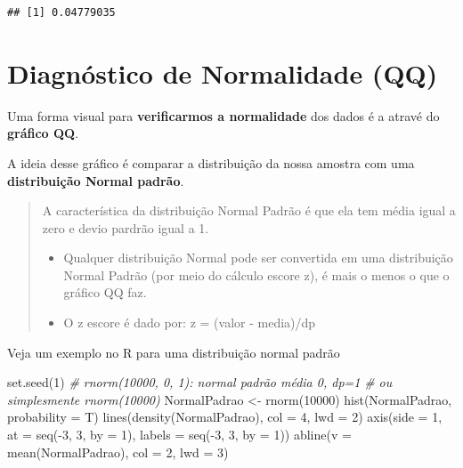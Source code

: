 \documentclass[
]{book}
\newenvironment{Shaded}{\begin{snugshade}}{\end{snugshade}}
\newcommand{\AttributeTok}[1]{\textcolor[rgb]{0.77,0.63,0.00}{#1}}
\newcommand{\CommentTok}[1]{\textcolor[rgb]{0.56,0.35,0.01}{\textit{#1}}}
\newcommand{\DecValTok}[1]{\textcolor[rgb]{0.00,0.00,0.81}{#1}}
\newcommand{\FunctionTok}[1]{\textcolor[rgb]{0.00,0.00,0.00}{#1}}
\newcommand{\NormalTok}[1]{#1}
\newcommand{\OtherTok}[1]{\textcolor[rgb]{0.56,0.35,0.01}{#1}}
\newcommand{\SpecialCharTok}[1]{\textcolor[rgb]{0.00,0.00,0.00}{#1}}
\begin{document}
\begin{verbatim}
## [1] 0.04779035
\end{verbatim}

\hypertarget{diagnuxf3stico-de-normalidade-qq}{%
\section{Diagnóstico de Normalidade (QQ)}\label{diagnuxf3stico-de-normalidade-qq}}

Uma forma visual para \textbf{verificarmos a normalidade} dos dados é a atravé do \textbf{gráfico QQ}.

A ideia desse gráfico é comparar a distribuição da nossa amostra com uma \textbf{distribuição Normal padrão}.

\begin{quote}
A característica da distribuição Normal Padrão é que ela tem média igual a zero e devio pardrão igual a 1.

\begin{itemize}
\item
  Qualquer distribuição Normal pode ser convertida em uma distribuição Normal Padrão (por meio do cálculo escore z), é mais o menos o que o gráfico QQ faz.
\item
  O z escore é dado por: z = (valor - media)/dp
\end{itemize}
\end{quote}

Veja um exemplo no R para uma distribuição normal padrão

\begin{Shaded}
\begin{Highlighting}[]
\FunctionTok{set.seed}\NormalTok{(}\DecValTok{1}\NormalTok{)}
\CommentTok{\# rnorm(10000, 0, 1): normal padrão média 0, dp=1}
\CommentTok{\# ou simplesmente rnorm(10000)}
\NormalTok{NormalPadrao }\OtherTok{\textless{}{-}} \FunctionTok{rnorm}\NormalTok{(}\DecValTok{10000}\NormalTok{)}
\FunctionTok{hist}\NormalTok{(NormalPadrao, }\AttributeTok{probability =}\NormalTok{ T)}
\FunctionTok{lines}\NormalTok{(}\FunctionTok{density}\NormalTok{(NormalPadrao), }\AttributeTok{col =} \DecValTok{4}\NormalTok{, }\AttributeTok{lwd =} \DecValTok{2}\NormalTok{)}
\FunctionTok{axis}\NormalTok{(}\AttributeTok{side =} \DecValTok{1}\NormalTok{, }\AttributeTok{at =} \FunctionTok{seq}\NormalTok{(}\SpecialCharTok{{-}}\DecValTok{3}\NormalTok{, }\DecValTok{3}\NormalTok{, }\AttributeTok{by =} \DecValTok{1}\NormalTok{), }\AttributeTok{labels =} \FunctionTok{seq}\NormalTok{(}\SpecialCharTok{{-}}\DecValTok{3}\NormalTok{, }\DecValTok{3}\NormalTok{, }\AttributeTok{by =} \DecValTok{1}\NormalTok{))}
\FunctionTok{abline}\NormalTok{(}\AttributeTok{v =} \FunctionTok{mean}\NormalTok{(NormalPadrao), }\AttributeTok{col =} \DecValTok{2}\NormalTok{, }\AttributeTok{lwd =} \DecValTok{3}\NormalTok{)}
\end{Highlighting}
\end{Shaded}
\end{document}
